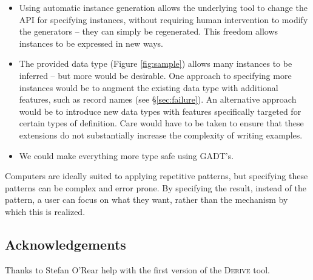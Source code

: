 \documentclass[preprint,draft]{sigplanconf}
\newcommand{\derive}{\textsc{Derive}}
\begin{document}
\begin{itemize}
\item Using automatic instance generation allows the underlying tool to change the API for specifying instances, without requiring human intervention to modify the generators -- they can simply be regenerated. This freedom allows instances to be expressed in new ways.
\item The provided data type (Figure \ref{fig:sample}) allows many instances to be inferred -- but more would be desirable. One approach to specifying more instances would be to augment the existing data type with additional features, such as record names (see \S\ref{sec:failure}). An alternative approach would be to introduce new data types with features specifically targeted for certain types of definition. Care would have to be taken to ensure that these extensions do not substantially increase the complexity of writing examples.
\item We could make everything more type safe using GADT's.
\end{itemize}

Computers are ideally suited to applying repetitive patterns, but specifying these patterns can be complex and error prone. By specifying the result, instead of the pattern, a user can focus on what they want, rather than the mechanism by which this is realized.

\subsection*{Acknowledgements}

Thanks to Stefan O'Rear help with the first version of the \derive{} tool.




\end{document}
